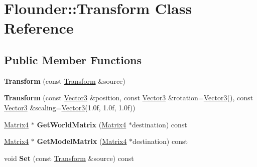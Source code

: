 \hypertarget{class_flounder_1_1_transform}{}\section{Flounder\+:\+:Transform Class Reference}
\label{class_flounder_1_1_transform}
\subsection*{Public Member Functions}
\begin{DoxyCompactItemize}
\item 
\mbox{\label{class_flounder_1_1_transform_a14379cbcab33c14f49ae8fe74ba0ae8c}} 
{\bfseries Transform} (const \hyperlink{class_flounder_1_1_transform}{Transform} \&source)
\item 
\mbox{\label{class_flounder_1_1_transform_a1769d0c47c8fcd781d80bf8211be0031}} 
{\bfseries Transform} (const \hyperlink{class_flounder_1_1_vector3}{Vector3} \&position, const \hyperlink{class_flounder_1_1_vector3}{Vector3} \&rotation=\hyperlink{class_flounder_1_1_vector3}{Vector3}(), const \hyperlink{class_flounder_1_1_vector3}{Vector3} \&scaling=\hyperlink{class_flounder_1_1_vector3}{Vector3}(1.\+0f, 1.\+0f, 1.\+0f))
\item 
\mbox{\label{class_flounder_1_1_transform_af58ccdf9ab9ef5a9decc290040503aea}} 
\hyperlink{class_flounder_1_1_matrix4}{Matrix4} $\ast$ {\bfseries Get\+World\+Matrix} (\hyperlink{class_flounder_1_1_matrix4}{Matrix4} $\ast$destination) const
\item 
\mbox{\label{class_flounder_1_1_transform_ac57a2fc8c3cef6cbf09b867ca0c13e90}} 
\hyperlink{class_flounder_1_1_matrix4}{Matrix4} $\ast$ {\bfseries Get\+Model\+Matrix} (\hyperlink{class_flounder_1_1_matrix4}{Matrix4} $\ast$destination) const
\item 
\mbox{\label{class_flounder_1_1_transform_aab1be4040ecaeca02dfe265ec295a506}} 
void {\bfseries Set} (const \hyperlink{class_flounder_1_1_transform}{Transform} \&source) const
\item 
\mbox{\label{class_flounder_1_1_transform_a09cea27e879855abb6153555def8331a}} 

\end{DoxyCompactItemize}
